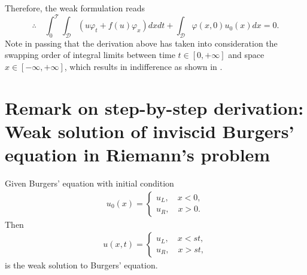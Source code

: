 \documentclass[12pt]{article}
\begin{document}
Therefore, the weak formulation reads
\begin{equation*}
	\therefore\quad
	\boxed{
	\int_{0}^{\mathscr{T}}\int_{\mathscr{D}}
	\left(
	u\varphi_{t} + f(u)\varphi_{x}\right) dxdt
	+\int_{\mathscr{D}}\varphi(x,0)u_{0}(x)dx
	=0.
	}
\end{equation*}
Note in passing that the derivation above has taken
into consideration the swapping order of integral limits between time $t\in[0,+\infty]$
and space $x\in[-\infty,+\infty]$, which 
results in indifference as shown in 
.
\clearpage
\section{Remark on step-by-step derivation: Weak solution of inviscid Burgers' equation in Riemann's problem}
\begin{example}
	Given Burgers' equation with initial condition 
	\begin{align*}
		u_{0}(x) = 
		\begin{cases}
			u_{L},\quad x<0, \\
			u_{R},\quad x>0.
		\end{cases}
	\end{align*}
	Then
	\begin{align*}
		u(x,t) = 
		\begin{cases}
			u_{L},\quad x<st, \\
			u_{R},\quad x>st,
		\end{cases}
	\end{align*}
	is the weak solution to Burgers' equation.
\end{example}
\end{document}
